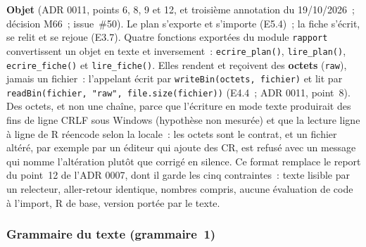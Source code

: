 \documentclass[a4paper,11pt]{article}
\newcommand{\code}[1]{\texttt{\small #1}}
\begin{document}
\textbf{Objet} (ADR 0011, points 6, 8, 9 et 12, et troisième annotation du
19/10/2026~; décision M66~; issue~\#50). Le plan s'exporte et s'importe
(E5.4)~; la fiche s'écrit, se relit et se rejoue (E3.7). Quatre fonctions
exportées du module \code{rapport} convertissent un objet en texte et
inversement~: \code{ecrire\_plan()}, \code{lire\_plan()},
\code{ecrire\_fiche()} et \code{lire\_fiche()}. Elles rendent et reçoivent
des \textbf{octets} (\code{raw}), jamais un fichier~: l'appelant écrit par
\code{writeBin(octets, fichier)} et lit par
\code{readBin(fichier, "raw", file.size(fichier))} (E4.4~; ADR 0011,
point~8). Des octets, et non une chaîne, parce que l'écriture en mode texte
produirait des fins de ligne CRLF sous Windows (hypothèse non mesurée) et que
la lecture ligne à ligne de R réencode selon la locale~: les octets sont le
contrat, et un fichier altéré, par exemple par un éditeur qui ajoute des CR,
est refusé avec un message qui nomme l'altération plutôt que corrigé en
silence. Ce format remplace le report du point~12 de l'ADR 0007, dont il
garde les cinq contraintes~: texte lisible par un relecteur, aller-retour
identique, nombres compris, aucune évaluation de code à l'import, R de base,
version portée par le texte.

\subsubsection*{Grammaire du texte (grammaire~1)}
\end{document}
